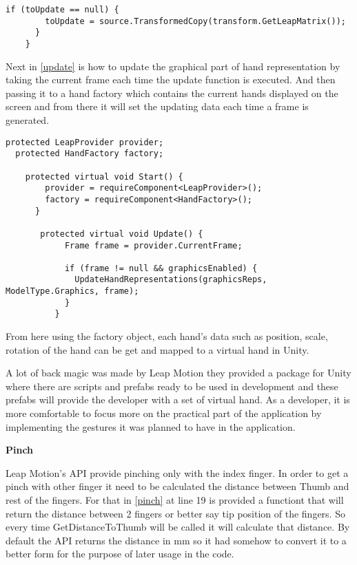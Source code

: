 {\begin{lstlisting}[caption={Leap Motion tracking matrix data.},label={matrix}]
      if (toUpdate == null) {
        toUpdate = source.TransformedCopy(transform.GetLeapMatrix());
      }
    } 
\end{lstlisting}

Next in \autoref{update} is how to update the graphical part of hand representation by taking the current frame each time the update function is executed. And then passing it to a hand factory which contains the current hands displayed on the screen and from there it will set the updating data each time a frame is generated.

\begin{lstlisting}[caption={Updating hand representations },label={update}]
  protected LeapProvider provider;
  protected HandFactory factory;
  
    protected virtual void Start() {
        provider = requireComponent<LeapProvider>();
        factory = requireComponent<HandFactory>();
      }
      
       protected virtual void Update() {
            Frame frame = provider.CurrentFrame;
      
            if (frame != null && graphicsEnabled) {
              UpdateHandRepresentations(graphicsReps, ModelType.Graphics, frame);
            }
          }
\end{lstlisting}

From here  using the factory object, each hand's data such as position, scale, rotation of the hand can be get and mapped to a virtual hand in Unity. 

A lot of back magic was made by Leap Motion they provided a package for Unity where there are scripts and prefabs ready to be used in development and these prefabs will provide the developer with a set of virtual hand. As a developer, it is more comfortable to focus more on the practical part of the application by implementing the gestures it was planned to have in the application.

\textbf{Pinch}

Leap Motion's API provide pinching only with the index finger. In order to get a pinch with other finger it need to be calculated the distance between Thumb and rest of the fingers. For that in \autoref{pinch} at line 19 is provided a functiont that will return the distance between 2 fingers or better say tip position of the fingers. So every time GetDistanceToThumb will be called it will calculate that distance. By default the API returns the distance in mm so it had somehow to convert it to a better form for the purpose of later usage in the code.

}
